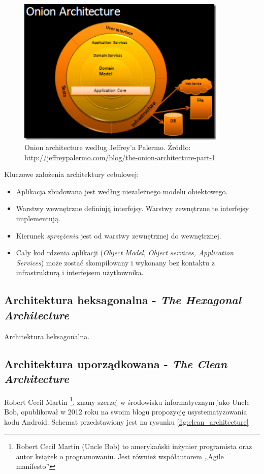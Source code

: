 \begin{figure}[!htb]
    \centering
    \includegraphics[width=10cm]{imgs/ch4_onion_architecture.png}
    \caption
{Onion architecture według Jeffrey'a Palermo. Źródło: \url{http://jeffreypalermo.com/blog/the-onion-architecture-part-1}}
    \label{fig:onion_architecture}
\end{figure} 

Kluczowe założenia architektury cebulowej:
\begin{itemize}
\item 
Aplikacja zbudowana jest według niezależnego modelu obiektowego.
\item
Warstwy wewnętrzne definiują interfejsy. Warstwy zewnętrzne te interfejsy implementują.
\item
Kierunek \textit{sprzężenia} jest od warstwy zewnętrznej do wewnętrznej.
\item
Cały kod rdzenia aplikacji (\textit{Object Model, Object services, Application Services}) może zostać skompilowany i wykonany bez kontaktu z infrastrukturą i interfejsem użytkownika.
\end{itemize}


\subsection{Architektura heksagonalna - \textit{The Hexagonal Architecture}}
Architektura heksagonalna.

\subsection{Architektura uporządkowana - \textit{The Clean Architecture}}
Robert Cecil Martin \footnote{Robert Cecil Martin (Uncle Bob) to amerykański inżynier programista oraz autor książek o programowaniu. Jest również współautorem „Agile manifesto”}, znany szerzej w środowisku informatycznym jako Uncle Bob, opublikował w 2012 roku na swoim blogu propozycję usystematyzowania kodu Android. Schemat przedstawiony jest na rysunku \ref{fig:clean_architecture}

